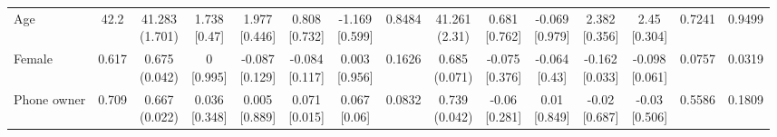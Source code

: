 {\begin{tabular}[t]{lcccccccccccccc}
\addlinespace[0.3em]
\hline
\multicolumn{15}{l}{\textit{\textbf{Panel B: Endline observability sample, $N=1,141$}}}\\
\hline
\hspace{1em}Age & 42.2 & \makecell[c]{41.283\\(1.701)} & \makecell[c]{1.738\\{[0.47]}} & \makecell[c]{1.977\\{[0.446]}} & \makecell[c]{0.808\\{[0.732]}} & \makecell[c]{-1.169\\{[0.599]}} & 0.8484 & \makecell[c]{41.261\\(2.31)} & \makecell[c]{0.681\\{[0.762]}} & \makecell[c]{-0.069\\{[0.979]}} & \makecell[c]{2.382\\{[0.356]}} & \makecell[c]{2.45\\{[0.304]}} & 0.7241 & 0.9499\\
\hspace{1em}Female & 0.617 & \makecell[c]{0.675\\(0.042)} & \makecell[c]{0\\{[0.995]}} & \makecell[c]{-0.087\\{[0.129]}} & \makecell[c]{-0.084\\{[0.117]}} & \makecell[c]{0.003\\{[0.956]}} & 0.1626 & \makecell[c]{0.685\\(0.071)} & \makecell[c]{-0.075\\{[0.376]}} & \makecell[c]{-0.064\\{[0.43]}} & \makecell[c]{-0.162\\{[0.033]}} & \makecell[c]{-0.098\\{[0.061]}} & 0.0757 & 0.0319\\
\hspace{1em}Phone owner & 0.709 & \makecell[c]{0.667\\(0.022)} & \makecell[c]{0.036\\{[0.348]}} & \makecell[c]{0.005\\{[0.889]}} & \makecell[c]{0.071\\{[0.015]}} & \makecell[c]{0.067\\{[0.06]}} & 0.0832 & \makecell[c]{0.739\\(0.042)} & \makecell[c]{-0.06\\{[0.281]}} & \makecell[c]{0.01\\{[0.849]}} & \makecell[c]{-0.02\\{[0.687]}} & \makecell[c]{-0.03\\{[0.506]}} & 0.5586 & 0.1809\\

\end{tabular}}
